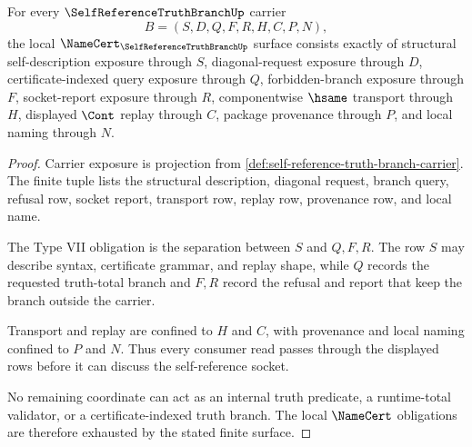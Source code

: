 \begin{theorem}
\label{thm:self-reference-truth-branch-namecert-obligations}
For every $\SelfReferenceTruthBranchUp$ carrier
$$
B=(S,D,Q,F,R,H,C,P,N),
$$
the local $\NameCert_{\SelfReferenceTruthBranchUp}$ surface consists exactly of structural self-description exposure through $S$, diagonal-request exposure through $D$, certificate-indexed query exposure through $Q$, forbidden-branch exposure through $F$, socket-report exposure through $R$, componentwise $\hsame$ transport through $H$, displayed $\Cont$ replay through $C$, package provenance through $P$, and local naming through $N$.
\end{theorem}
\begin{proof}
Carrier exposure is projection from \autoref{def:self-reference-truth-branch-carrier}. The finite tuple lists the structural description, diagonal request, branch query, refusal row, socket report, transport row, replay row, provenance row, and local name.

The Type VII obligation is the separation between $S$ and $Q,F,R$. The row $S$ may describe syntax, certificate grammar, and replay shape, while $Q$ records the requested truth-total branch and $F,R$ record the refusal and report that keep the branch outside the carrier.

Transport and replay are confined to $H$ and $C$, with provenance and local naming confined to $P$ and $N$. Thus every consumer read passes through the displayed rows before it can discuss the self-reference socket.

No remaining coordinate can act as an internal truth predicate, a runtime-total validator, or a certificate-indexed truth branch. The local $\NameCert$ obligations are therefore exhausted by the stated finite surface.
\end{proof}

